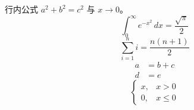 \documentclass{article}
\begin{document}
行内公式 $a^2+b^2=c^2$ 与 \(x \to 0\)。
\[
  \int_0^\infty e^{-x^2}\,dx = \frac{\sqrt{\pi}}{2}
\]
$$
  \sum_{i=1}^{n} i = \frac{n(n+1)}{2}
$$
\begin{align}
  a &= b + c \\
  d &= e
\end{align}
\begin{equation}
  \begin{cases}
    x, & x > 0 \\
    0, & x \le 0
  \end{cases}
\end{equation}
\end{document}
